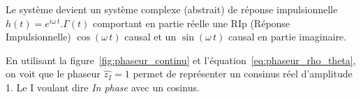 
Le système devient un système complexe (abstrait) de réponse
impulsionnelle $h(t)=e^{i\omega\,t}.\Gamma(t)$ comportant en partie
réelle une RIp (Réponse Impulsionnelle) $\cos\!\left(\omega\,t\right)$
causal et un $\sin\!\left(\omega\,t\right)$ causal en partie imaginaire.
\newpage
{}


En utilisant la figure~\ref{fig:phaseur_continu} et l'équation~\ref{eq:phaseur_rho_theta}, on voit que le phaseur $\widehat{z_I}=1$ permet de représenter un consinus réel
d'amplitude 1. Le I voulant dire \emph{In phase} avec un cosinus.

